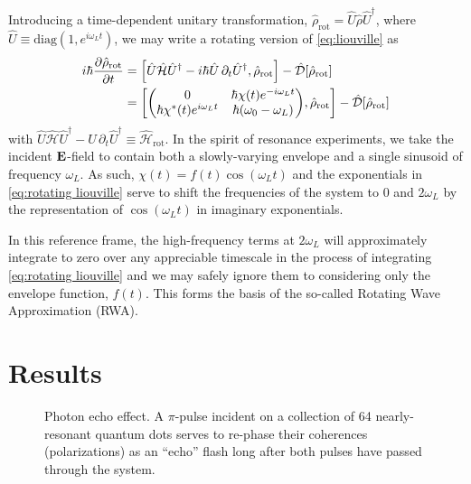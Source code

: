 \documentclass[conference]{IEEEtran}
\begin{document}
Introducing a time-dependent unitary transformation, $\hat{\rho}_\text{rot} = \hat{U}\hat{\rho}\hat{U}^\dagger$, where $\hat{U} \equiv \text{diag}(1, e^{i \omega_L t})$,
we may write a rotating version of \cref{eq:liouville} as
\begin{equation}
  \begin{aligned}
    i \hbar \pdv{\hat{\rho}_\text{rot}}{t} &= \commutator{\hat{U} \hat{\mathcal{H}} \hat{U}^\dagger - i \hbar \hat{U} \, \partial_t \hat{U}^\dagger}{\hat{\rho}_\text{rot}} - \hat{\mathcal{D}}[\hat{\rho}_\text{rot}] \\
    &= \commutator{\mqty(0 & \hbar \chi(t)e^{-i \omega_L t} \\ \hbar \chi^*(t) e^{i \omega_L t} & \hbar\qty(\omega_0 - \omega_L))}{\hat{\rho}_\text{rot}} - \hat{\mathcal{D}}[\hat{\rho}_\text{rot}]
  \end{aligned}
  \label{eq:rotating liouville}
\end{equation}
with $\hat{U} \hat{\mathcal{H}} \hat{U}^\dagger - \hat{U} \, \partial_t \hat{U}^\dagger \equiv \hat{\mathcal{H}}_\text{rot}$.
In the spirit of resonance experiments, we take the incident $\vb{E}$-field to contain both a slowly-varying envelope and a single sinusoid of frequency $\omega_L$.
As such, $\chi(t) = f(t)\cos(\omega_L t)$ and the exponentials in \cref{eq:rotating liouville} serve to shift the frequencies of the system to $0$ and $2\omega_L$ by the representation of $\cos(\omega_L t)$ in imaginary exponentials.

In this reference frame, the high-frequency terms at $2 \omega_L$ will approximately integrate to zero over any appreciable timescale in the process of integrating \cref{eq:rotating liouville} and we may safely ignore them to considering only the envelope function, $f(t)$. This forms the basis of the so-called Rotating Wave Approximation (RWA)\cite{Allen1987}.

\section{Results}

\begin{figure}
  \centering
  
  \caption{\label{fig:echo} Photon echo effect.
    A $\pi$-pulse incident on a collection of 64 nearly-resonant quantum dots serves to re-phase their coherences (polarizations) as an ``echo'' flash long after both pulses have passed through the system.
  }
\end{figure}
\end{document}
